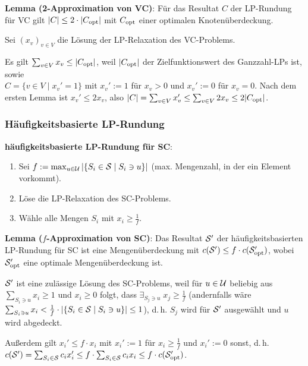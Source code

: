 \linie

\textbf{Lemma (2-Approximation von VC)}:
Für das Resultat $C$ der LP-Rundung für VC gilt $|C| \le 2 \cdot |C_\opt|$
mit $C_\opt$ einer optimalen Knotenüberdeckung.

\begin{Beweis}
    Sei $(x_v)_{v \in V}$ die Lösung der LP-Relaxation des VC-Problems.
    
    Es gilt $\sum_{v \in V} x_v \le |C_\opt|$,
    weil $|C_\opt|$ der Zielfunktionswert des Ganzzahl-LPs ist, sowie\\
    $C = \{v \in V \;|\; x_v' = 1\}$ mit
    $x_v' := 1$ für $x_v > 0$ und
    $x_v' := 0$ für $x_v = 0$.
    Nach dem ersten Lemma ist $x_v' \le 2x_v$,
    also $|C| = \sum_{v \in V} x_v' \le \sum_{v \in V} 2x_v \le 2 |C_\opt|$.
\end{Beweis}

\pagebreak

\subsubsection{%
    Häufigkeitsbasierte LP-Rundung%
}

\textbf{häufigkeitsbasierte LP-Rundung für SC}:
\begin{enumerate}
    \item
    Sei $f := \max_{u \in \U} |\{S_i \in \S \;|\; S_i \ni u\}|$
    (max. Mengenzahl, in der ein Element vorkommt).
    
    \item
    Löse die LP-Relaxation des SC-Problems.
    
    \item
    Wähle alle Mengen $S_i$ mit $x_i \ge \frac{1}{f}$.
\end{enumerate}

\linie

\textbf{Lemma ($f$-Approximation von SC)}:
Das Resultat $\S'$ der häufigkeitsbasierten LP-Rundung für SC ist eine Mengenüberdeckung mit
$c(\S') \le f \cdot c(\S'_\opt)$, wobei $\S'_\opt$ eine optimale Mengenüberdeckung ist.

\begin{Beweis}
    $\S'$ ist eine zulässige Lösung des SC-Problems, weil
    für $u \in \U$ beliebig
    aus $\sum_{S_i \ni u} x_i \ge 1$ und $x_i \ge 0$ folgt, dass
    $\exists_{S_j \ni u}\; x_j \ge \frac{1}{f}$
    (andernfalls wäre
    $\sum_{S_i \ni u} x_i < \frac{1}{f} \cdot |\{S_i \in \S \;|\; S_i \ni u\}| \le 1$),
    d.\,h. $S_j$ wird für $\S'$ ausgewählt und $u$ wird abgedeckt.
    
    Außerdem gilt $x_i' \le f \cdot x_i$ mit $x_i' := 1$ für $x_i \ge \frac{1}{f}$ und
    $x_i' := 0$ sonst, d.\,h.\\
    $c(\S') = \sum_{S_i \in \S} c_i x_i' \le f \cdot \sum_{S_i \in \S} c_i x_i \le
    f \cdot c(\S'_\opt)$.
\end{Beweis}

